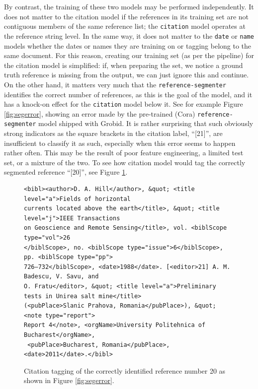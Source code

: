 \documentclass[11pt, oneside]{scrartcl}   	%
\begin{document}
By contrast, the training of these two models may be performed independently. It does not matter to the citation model if the references in its training set are not contiguous members of the same reference list; the \texttt{citation} model operates at the reference string level. In the same way, it does not matter to the \texttt{date} or \texttt{name} models whether the dates or names they are training on or tagging belong to the same document. For this reason, creating our training set (as per the pipeline) for the citation model is simplified: if, when preparing the set, we notice a ground truth reference is missing from the output, we can just ignore this and continue. On the other hand, it matters very much that the \texttt{reference-segmenter} identifies the correct number of references, as this is the goal of the model, and it has a knock-on effect for the \texttt{citation} model below it. See for example Figure \ref{fig:segerror}, showing an error made by the pre-trained (Cora) \texttt{reference-segmenter} model shipped with Grobid.  It is rather surprising that such obviously strong indicators as the square brackets in the citation label, ``[21]'', are insufficient to classify it as such, especially when this error seems to happen rather often. This may be the result of poor feature engineering, a limited test set, or a mixture of the two. To see how citation model would tag the correctly segmented reference ``[20]'', see Figure \ref{fig:citsample}.

\begin{figure}
\begin{verbatim}
<bibl><author>D. A. Hill</author>, &quot; <title level="a">Fields of horizontal 
currents located above the earth</title>, &quot; <title level="j">IEEE Transactions
on Geoscience and Remote Sensing</title>, vol. <biblScope type="vol">26
</biblScope>, no. <biblScope type="issue">6</biblScope>, pp. <biblScope type="pp">
726–732</biblScope>, <date>1988</date>. [<editor>21] A. M. Badescu, V. Savu, and
O. Fratu</editor>, &quot; <title level="a">Preliminary tests in Unirea salt mine</title>
(<pubPlace>Slanic Prahova, Romania</pubPlace>), &quot; <note type="report">
Report 4</note>, <orgName>University Politehnica of Bucharest</orgName>,
 <pubPlace>Bucharest, Romania</pubPlace>, <date>2011</date>.</bibl>
\end{verbatim}
\caption{Citation tagging of the correctly identified reference number 20 as shown in Figure \ref{fig:segerror}.}
\label{fig:citsample}
\end{figure}
\end{document}
